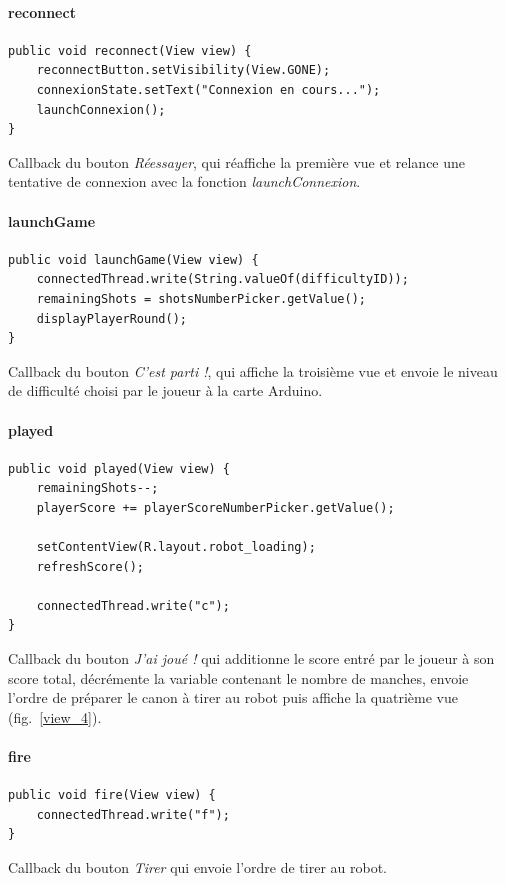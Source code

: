 \paragraph{reconnect}

\begin{lstlisting}
public void reconnect(View view) {
	reconnectButton.setVisibility(View.GONE);
	connexionState.setText("Connexion en cours...");
	launchConnexion();
}
\end{lstlisting}
Callback du bouton \emph{Réessayer}, qui réaffiche la première vue et relance une tentative de connexion avec la fonction \emph{launchConnexion}.

\paragraph{launchGame}

\begin{lstlisting}
public void launchGame(View view) {
	connectedThread.write(String.valueOf(difficultyID));
	remainingShots = shotsNumberPicker.getValue();
	displayPlayerRound();
}
\end{lstlisting}
Callback du bouton \emph{C'est parti !}, qui affiche la troisième vue et envoie le niveau de difficulté choisi par le joueur à la carte Arduino.

\paragraph{played}

\begin{lstlisting}
public void played(View view) {
	remainingShots--;
	playerScore += playerScoreNumberPicker.getValue();

	setContentView(R.layout.robot_loading);
	refreshScore();

	connectedThread.write("c");
}
\end{lstlisting}
Callback du bouton \emph{J'ai joué !} qui additionne le score entré par le joueur à son score total, décrémente la variable contenant le nombre de manches, envoie l'ordre de préparer le canon à tirer au robot puis affiche la quatrième vue (fig.~\ref{view_4}).

\paragraph{fire}

\begin{lstlisting}
public void fire(View view) {
	connectedThread.write("f");
}
\end{lstlisting}
Callback du bouton \emph{Tirer} qui envoie l'ordre de tirer au robot.

